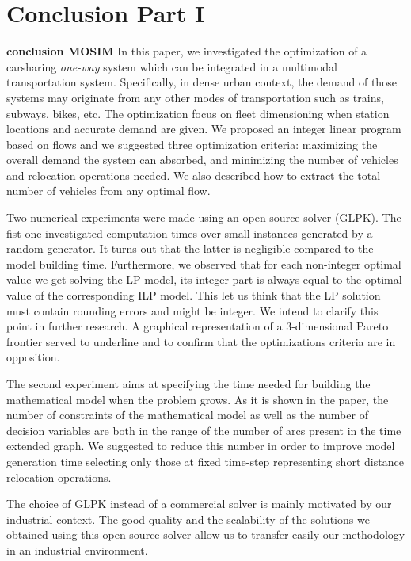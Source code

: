 \chapter*{Conclusion Part I} \label{chap:conclusionPart1}

\textbf{conclusion MOSIM}
In this paper, we investigated the optimization of a carsharing \emph{one-way} system which can be integrated in a multimodal transportation system. Specifically, in dense urban context, the demand of those systems may originate from any other modes of transportation such as trains, subways, bikes, etc. The optimization focus on fleet dimensioning when station locations and accurate demand are given. We proposed an integer linear program based on flows and we suggested three optimization criteria: maximizing the overall demand the system can absorbed, and minimizing the number of vehicles and relocation operations needed. We also described how to extract the total number of vehicles from any optimal flow.

Two numerical experiments were made using an open-source solver (GLPK). The fist one investigated computation times over small instances generated by a random generator. It turns out that the latter is negligible compared to the model building time. Furthermore, we observed that for each non-integer optimal value we get solving the LP model, its integer part is always equal to the optimal value of the corresponding ILP model. This let us think that the LP solution must contain rounding errors and might be integer. We intend to clarify this point in further research. A graphical representation of a 3-dimensional Pareto frontier served to underline and to confirm that the optimizations criteria are in opposition.

The second experiment aims at specifying the time needed for building the mathematical model when the problem grows. As it is shown in the paper, the number of constraints of the mathematical model as well as the number of decision variables are both in the range of the number of arcs present in the time extended graph. We suggested to reduce this number in order to improve model generation time selecting only those at fixed time-step representing short distance relocation operations.

The choice of GLPK instead of a commercial solver is mainly motivated by our industrial context.
The good quality and the scalability of the solutions we obtained using this open-source solver allow us to transfer easily our methodology in an industrial environment.

